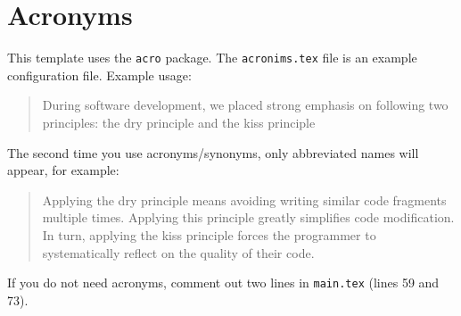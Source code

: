 \section{Acronyms}

This template uses the \texttt{acro} package. The \texttt{acronims.tex} file is an example configuration file.
Example usage:
\begin{quote}
  During software development, we placed strong emphasis on following two
  principles: the \ac{dry} principle and the \ac{kiss} principle
\end{quote}
The second time you use acronyms/synonyms, only abbreviated names will appear, for example:
\begin{quote}
  Applying the \ac{dry} principle means avoiding writing similar code fragments multiple times. Applying this principle greatly simplifies code modification.
  In turn, applying the \ac{kiss} principle forces the programmer to systematically reflect on the quality of their code.
\end{quote}

If you do not need acronyms, comment out two lines in \texttt{main.tex} (lines 59 and 73).
